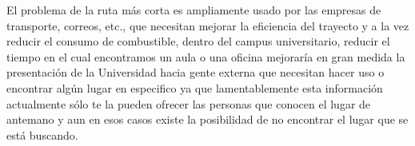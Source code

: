     El problema de la ruta más corta es ampliamente usado por las empresas de transporte, correos, etc., que necesitan mejorar la eficiencia del trayecto y a la vez reducir el consumo de combustible, dentro del campus universitario, reducir el tiempo en el cual encontramos un aula o una oficina mejoraría en gran medida la presentación de la Universidad hacia gente externa que necesitan hacer uso o encontrar algún lugar en especifico ya que lamentablemente esta información actualmente sólo te la pueden ofrecer las personas que conocen el lugar de antemano y aun en esos casos existe la posibilidad de no encontrar el lugar que se está buscando.\\





















